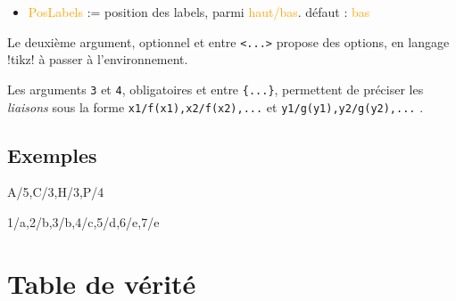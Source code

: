 \documentclass[french,a4paper,11pt]{article}
\newcommand\Cle[1]{{\small\sffamily\textlangle \textcolor{orange}{#1}\textrangle}}
\begin{document}
{{\begin{tipblock}
\begin{itemize}
	\hfill{}défaut : \Cle{\$\textbackslash mathcal\{E\}\$/\$\textbackslash  mathcal\{F\}\$/\$\textbackslash  mathcal\{G\}\$}
	\item \Cle{PosLabels} := position des labels, parmi \Cle{haut/bas}. \hfill{}défaut : \Cle{bas}
\end{itemize}

Le deuxième argument, optionnel et entre \texttt{<...>} propose des options, en langage \packagetex!tikz! à passer à l'environnement.

\smallskip

Les arguments \texttt{3} et \texttt{4}, obligatoires et entre \texttt{\{...\}}, permettent de préciser les \textit{liaisons} sous la forme \verb!x1/f(x1),x2/f(x2),...! et \verb!y1/g(y1),y2/g(y2),...! .
\end{tipblock}

\subsection{Exemples}

\begin{DemoCode}[]
%
	{A/5,C/3,H/3,P/4}%
\end{DemoCode}

\begin{DemoCode}[]
%
	{1/a,2/b,3/b,4/c,5/d,6/e,7/e}%
\end{DemoCode}

\begin{DemoCode}[]
\end{DemoCode}

\pagebreak

\section{Table de vérité}

}}
\end{document}
